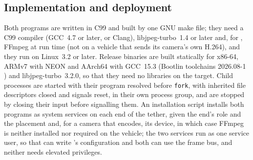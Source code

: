 \subsection{Implementation and deployment}\label{sec:implementation}

Both programs are written in C99 and built by one GNU make file; they need a C99
compiler (GCC~4.7 or later, or Clang), libjpeg-turbo~1.4 or later
and, for \hellion{},
FFmpeg at run time (not on a vehicle that sends its camera's own
H.264), and they run
on Linux~3.2 or later. Release binaries are built
statically for x86-64, ARMv7 with NEON and AArch64 with GCC~15.3
(Bootlin toolchains
2026.08-1 \cite{bootlin}) and libjpeg-turbo~3.2.0, so that they need
no libraries
on the target. Child processes are started with their program resolved before
\texttt{fork}, with inherited file descriptors closed and signals
reset, in their own
process group, and are stopped by closing their input before signalling them. An
installation script installs both programs as system services on each end of the
tether, given the end's role and the placement and, for a camera that
encodes, its device,
in which case FFmpeg is neither installed nor required on the
vehicle; the two services run as one service
user, so that \hellion{} can write \eeye{}'s configuration and both
can use the frame
bus, and neither needs elevated privileges.
